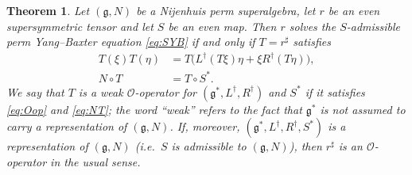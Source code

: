 \documentclass[11pt]{article}
\newtheorem{theorem}{Theorem}[section]
\theoremstyle{definition}
\newcommand{\g}{\mathfrak{g}}
\begin{document}
\begin{theorem}\label{thm:O}
Let $(\g,N)$ be a Nijenhuis perm superalgebra, let $r$ be an even supersymmetric tensor and let $S$ be an even map. Then $r$ solves the $S$-admissible perm Yang--Baxter equation \eqref{eq:SYB} if and only if $T=r^\sharp$ satisfies
\begin{align}
T(\xi)T(\eta)&=T\bigl(L^\dagger(T\xi)\eta+\xi R^\dagger(T\eta)\bigr),\label{eq:Oop}\\
N\circ T&=T\circ S^*.\label{eq:NT}
\end{align}
We say that $T$ is a \emph{weak $\mathcal O$-operator} for $(\g^*,L^\dagger,R^\dagger)$ and $S^*$ if it satisfies \eqref{eq:Oop} and \eqref{eq:NT}; the word ``weak'' refers to the fact that $\g^*$ is not assumed to carry a representation of $(\g,N)$. If, moreover, $(\g^*,L^\dagger,R^\dagger,S^*)$ is a representation of $(\g,N)$ (i.e.\ $S$ is admissible to $(\g,N)$), then $r^\sharp$ is an $\mathcal O$-operator in the usual sense.
\end{theorem}
\end{document}
